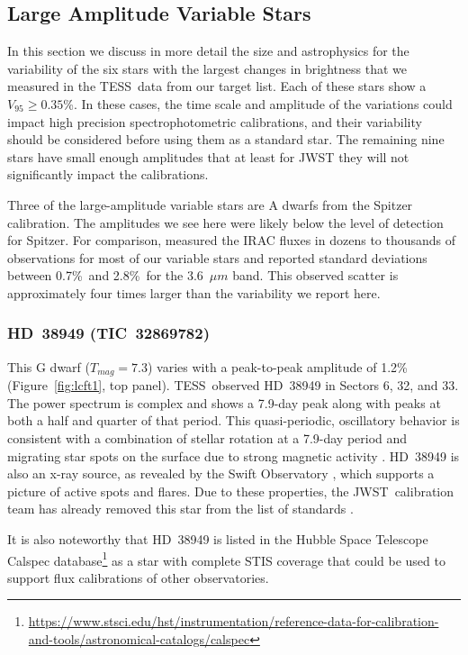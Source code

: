 \documentclass[twocolumn]{aastex631}
\newcommand{\jwst}{JWST}
\newcommand{\tess}{TESS}
\begin{document}
\subsection{Large Amplitude Variable Stars}

In this section we discuss in more detail the size and astrophysics for the variability of the six stars with the largest changes in brightness that we measured in the \tess\ data from our target list. Each of these stars show a $V_{95}\ge0.35$\%. In these cases, the time scale and amplitude of the variations could impact high precision spectrophotometric calibrations, and their variability should be considered before using them as a standard star. The remaining nine stars have small enough amplitudes that at least for JWST they will not significantly impact the calibrations. 

Three of the large-amplitude variable stars are A dwarfs from the \citet{Reach2005} Spitzer calibration. The amplitudes we see here were likely below the level of detection for Spitzer. For comparison, \citet{Krick2021IRAC} measured the IRAC fluxes in dozens to thousands of observations for most of our variable stars and reported standard deviations between 0.7\%\ and 2.8\%\ for the 3.6~$\mu m$ band.  This observed scatter is approximately four times larger than the variability we report here.


\subsubsection{HD~38949 (TIC~32869782)}

This G dwarf ($T_{mag}=7.3$) varies with a peak-to-peak amplitude of 1.2\% (Figure~\ref{fig:lcft1}, top panel). \tess\ observed HD~38949 in Sectors 6, 32, and 33.  The power spectrum is complex and shows a 7.9-day peak along with peaks at both a half and quarter of that period. This quasi-periodic, oscillatory behavior is consistent with a combination of stellar rotation at a 7.9-day period and migrating star spots on the surface due to strong magnetic activity \citep{Santos2021}.  HD~38949 is also an x-ray source, as revealed by the Swift Observatory \citep{Swift2020,Evans2020vizier}, which supports a picture of active spots and flares. Due to these properties, the \jwst\ calibration team has already removed this star from the list of standards \citep{Gordon2022inprep}.

It is also noteworthy that HD~38949 is listed in the Hubble Space Telescope Calspec database\footnote{\url{https://www.stsci.edu/hst/instrumentation/reference-data-for-calibration-and-tools/astronomical-catalogs/calspec}} \citep{Bohlin2014PASP126} as a star with complete STIS coverage that could be used to support flux calibrations of other observatories.
\end{document}
